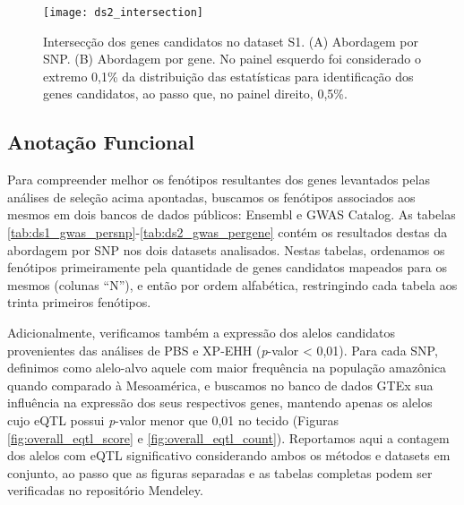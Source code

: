 \begin{figure}[!htbp] %
    \centering
    \texttt{[image: ds2\_intersection]}
    \caption[Intersecção dos genes candidatos no dataset S2.]{Intersecção dos genes candidatos no dataset S1. (A) Abordagem por SNP. (B) Abordagem por gene. No painel esquerdo foi considerado o extremo 0,1\% da distribuição das estatísticas para identificação dos genes candidatos, ao passo que, no painel direito, 0,5\%.}
    \label{fig:ds2_intersection}
\end{figure}

\clearpage
\subsection{Anotação Funcional}
\label{subsec:amazonia_results_annotfuncional}

Para compreender melhor os fenótipos resultantes dos genes levantados pelas análises de seleção acima apontadas, buscamos os fenótipos associados aos mesmos em dois bancos de dados públicos: Ensembl e GWAS Catalog. As tabelas \ref{tab:ds1_gwas_persnp}-\ref{tab:ds2_gwas_pergene} contém os resultados destas da abordagem por SNP nos dois datasets analisados. Nestas tabelas, ordenamos os fenótipos primeiramente pela quantidade de genes candidatos mapeados para os mesmos (colunas “N”), e então por ordem alfabética, restringindo cada tabela aos trinta primeiros fenótipos.

Adicionalmente, verificamos também a expressão dos alelos candidatos provenientes das análises de PBS e XP-EHH (\emph{p}-valor < 0,01). Para cada SNP, definimos como alelo-alvo aquele com maior frequência na população amazônica quando comparado à Mesoamérica, e buscamos no banco de dados GTEx sua influência na expressão dos seus respectivos genes, mantendo apenas os alelos cujo eQTL possui \emph{p}-valor menor que 0,01 no tecido (Figuras \ref{fig:overall_eqtl_score} e \ref{fig:overall_eqtl_count}). Reportamos aqui a contagem dos alelos com eQTL significativo considerando ambos os métodos e datasets em conjunto, ao passo que as figuras separadas e as tabelas completas podem ser verificadas no repositório Mendeley.





